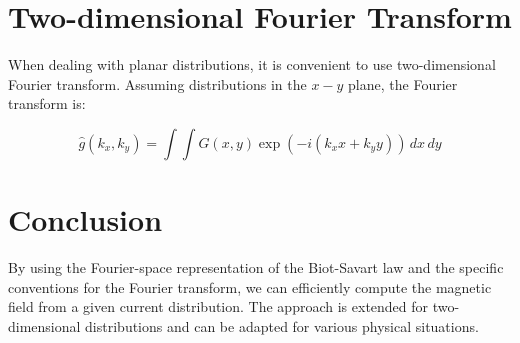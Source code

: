 \documentclass[justified, nobib]{tufte-handout}
\begin{document}
\section{Two-dimensional Fourier Transform}

When dealing with planar distributions, it is convenient to use two-dimensional Fourier transform. Assuming distributions in the \(x-y\) plane, the Fourier transform is:

\begin{equation}
\hat{g}(k_x, k_y) = \int \int G(x, y) \exp(-i(k_x x + k_y y)) \, dx \, dy
\end{equation}


\section{Conclusion}
By using the Fourier-space representation of the Biot-Savart law and the specific conventions for the Fourier transform, we can efficiently compute the magnetic field from a given current distribution. The approach is extended for two-dimensional distributions and can be adapted for various physical situations.
\end{document}
